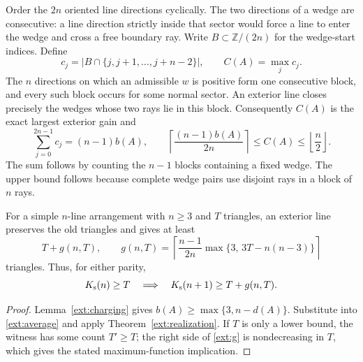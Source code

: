Order the $2n$ oriented line directions cyclically.  The two directions
of a wedge are consecutive: a line direction strictly inside that sector
would force a line to enter the wedge and cross a free boundary ray.
Write $B\subset\mathbb Z/(2n)$ for the wedge-start indices.  Define
\begin{equation}
 c_j=\bigl|B\cap\{j,j+1,\ldots,j+n-2\}\bigr|,
 \qquad C(A)=\max_j c_j.
 \label{ext:profile}
\end{equation}
The $n$ directions on which an admissible $w$ is positive form one
consecutive block, and every such block occurs for some normal sector.
An exterior line closes precisely the wedges whose two rays lie in this
block.  Consequently $C(A)$ is the exact largest exterior gain and
\begin{equation}
 \sum_{j=0}^{2n-1}c_j=(n-1)b(A),\qquad
 \left\lceil\frac{(n-1)b(A)}{2n}\right\rceil
 \leq C(A)\leq\left\lfloor\frac n2\right\rfloor.
 \label{ext:average}
\end{equation}
The sum follows by counting the $n-1$ blocks containing a fixed wedge.
The upper bound follows because complete wedge pairs use disjoint rays
in a block of $n$ rays.

\begin{theorem}
\label{ext:defect-theorem}
For a simple $n$-line arrangement with $n\geq3$ and $T$ triangles, an
exterior line preserves the old triangles and gives at least
\begin{equation}
 T+g(n,T),\qquad
 g(n,T)=\left\lceil\frac{n-1}{2n}
       \max\{3,\,3T-n(n-3)\}\right\rceil
 \label{ext:g}
\end{equation}
triangles.  Thus, for either parity,
\[
 K_{\mathrm{s}}(n)\geq T\quad\Longrightarrow\quad
 K_{\mathrm{s}}(n+1)\geq T+g(n,T).
\]
\end{theorem}

\begin{proof}
Lemma~\ref{ext:charging} gives
$b(A)\geq\max\{3,n-d(A)\}$.  Substitute into
\eqref{ext:average} and apply Theorem~\ref{ext:realization}.  If $T$ is
only a lower bound, the witness has some count $T'\geq T$; the right side
of \eqref{ext:g} is nondecreasing in $T$, which gives the stated
maximum-function implication.
\end{proof}

